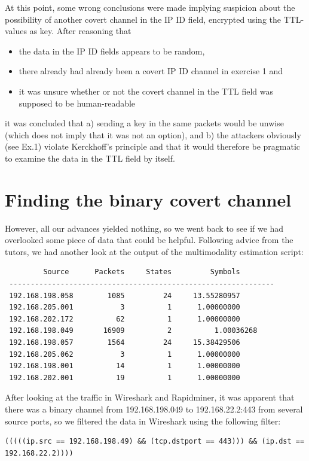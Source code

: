 \documentclass{article}
\begin{document}
At this point, some wrong conclusions were made implying suspicion about the possibility of another covert channel in the IP ID field, encrypted using the TTL-values as key. After reasoning that
\begin{itemize}
\item the data in the IP ID fields appears to be random,
\item there already had already been a covert IP ID channel in exercise 1 and
\item it was unsure whether or not the covert channel in the TTL field was supposed to be human-readable
\end{itemize}
it was concluded that a) sending a key in the same packets would be unwise (which does not imply that it was not an option), and b) the attackers obviously (see Ex.1) violate Kerckhoff's principle and that it would therefore be pragmatic to examine the data in the TTL field by itself. 

\section*{Finding the binary covert channel}
However, all our advances yielded nothing, so we went back to see if we had overlooked some piece of data that could be helpful. Following advice from the tutors, we had another look at the output of the multimodality estimation script:

\begin{verbatim}
         Source		 Packets	 States	        Symbols
 -------------------------------------------------------------- 
 192.168.198.058	    1085	     24	    13.55280957
 192.168.205.001	       3	      1	     1.00000000
 192.168.202.172	      62	      1	     1.00000000
 192.168.198.049	   16909	      2	    	 1.00036268
 192.168.198.057	    1564	     24	    15.38429506
 192.168.205.062	       3	      1	     1.00000000
 192.168.198.001	      14	      1	     1.00000000
 192.168.202.001	      19	      1	     1.00000000
\end{verbatim}

After looking at the traffic in Wireshark and Rapidminer, it was apparent that there was a binary channel from 192.168.198.049 to 192.168.22.2:443 from several source ports, so we filtered the data in Wireshark using the following filter:
\begin{verbatim}
(((((ip.src == 192.168.198.49) && (tcp.dstport == 443))) && (ip.dst == 192.168.22.2))))
\end{verbatim}
\end{document}
